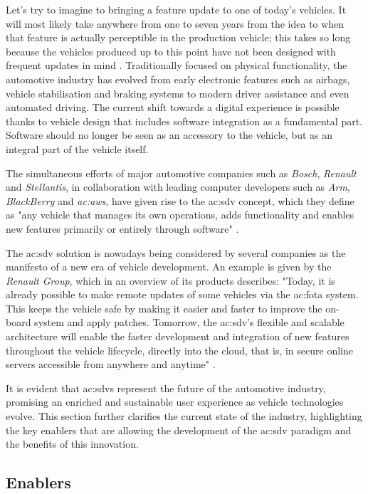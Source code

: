 Let's try to imagine to bringing a feature update to one of today's vehicles. It will most likely take anywhere from one to seven years from the idea to when that feature is actually perceptible in the production vehicle; this takes so long because the vehicles produced up to this point have not been designed with frequent updates in mind \cite{SDVBosch}.
Traditionally focused on physical functionality, the automotive industry has evolved from early electronic features such as airbags, vehicle stabilisation and braking systems to modern driver assistance and even automated driving. 
The current shift towards a digital experience is possible thanks to vehicle design that includes software integration as a fundamental part. Software should no longer be seen as an accessory to the vehicle, but as an integral part of the vehicle itself.

The simultaneous efforts of major automotive companies such as \textit{Bosch}, \textit{Renault} and \textit{Stellantis}, in collaboration with leading computer developers such as \textit{Arm}, \textit{BlackBerry} and \textit{\gls{ac:aws}}, have given rise to the \gls{ac:sdv} concept, which they define as "any vehicle that manages its own operations, adds functionality and enables new features primarily or entirely through software" \cite{blackberrySDV}.

The \gls{ac:sdv} solution is nowadays being considered by several companies as the manifesto of a new era of vehicle development. An example is given by the \textit{Renault Group}, which in an overview of its products describes: "Today, it is already possible to make remote updates of some vehicles via the \gls{ac:fota} system. This keeps the vehicle safe by making it easier and faster to improve the on-board system and apply patches. Tomorrow, the \gls{ac:sdv}'s flexible and scalable architecture will enable the faster development and integration of new features throughout the vehicle lifecycle, directly into the cloud, that is, in secure online servers accessible from anywhere and anytime" \cite{SDVRenault}. 

It is evident that \gls{ac:sdv}s represent the future of the automotive industry, promising an enriched and sustainable user experience as vehicle technologies evolve. This section further clarifies the current state of the industry, highlighting the key enablers that are allowing the development of the \gls{ac:sdv} paradigm and the benefits of this innovation.

\subsection{Enablers}

